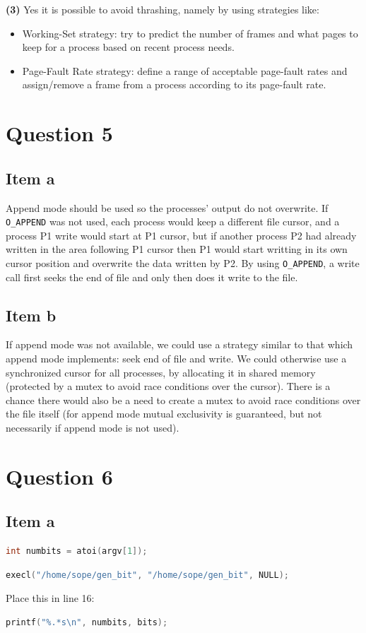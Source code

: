 {\textbf{(3)} Yes it is possible to avoid thrashing, namely by using strategies like:
\begin{itemize}
    \item Working-Set strategy: try to predict the number of frames and what pages to keep for a process based on recent process needs.
    \item Page-Fault Rate strategy: define a range of acceptable page-fault rates and assign/remove a frame from a process according to its page-fault rate.
\end{itemize}

\section{Question 5}
\subsection{Item a}
Append mode should be used so the processes' output do not overwrite. If \texttt{O\_APPEND} was not used, each process would keep a different file cursor, and a process P1 write would start at P1 cursor, but if another process P2 had already written in the area following P1 cursor then P1 would start writting in its own cursor position and overwrite the data written by P2. By using \texttt{O\_APPEND}, a write call first seeks the end of file and only then does it write to the file.

\subsection{Item b}
If append mode was not available, we could use a strategy similar to that which append mode implements: seek end of file and write. We could otherwise use a synchronized cursor for all processes, by allocating it in shared memory (protected by a mutex to avoid race conditions over the cursor). There is a chance there would also be a need to create a mutex to avoid race conditions over the file itself (for append mode mutual exclusivity is guaranteed, but not necessarily if append mode is not used).

\section{Question 6}
\subsection{Item a}
\begin{lstlisting}[language=C]
    int numbits = atoi(argv[1]);
\end{lstlisting}
\begin{lstlisting}[language=C]
    execl("/home/sope/gen_bit", "/home/sope/gen_bit", NULL);
\end{lstlisting}
Place this in line 16:
\begin{lstlisting}[language=C]
    printf("%.*s\n", numbits, bits);
\end{lstlisting}

}
